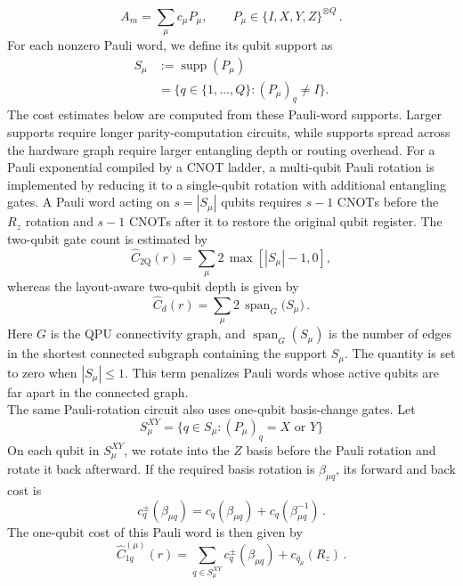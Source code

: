 \documentclass[
  reprint,
  amsmath,
  amssymb,
  aps,
  pra,
  nofootinbib,
  superscriptaddress,
  floatfix
]{revtex4-2}
\newcommand{\twq}{\mathrm{2Q}}
\begin{document}
\begin{equation}
A_m=\sum_{\mu}c_{\mu}P_{\mu}, \qquad P_{\mu}\in\{I,X,Y,Z\}^{\otimes Q}\,.
\label{eq:pauli_expansion}
\end{equation}
%
For each nonzero Pauli word, we define its qubit support as
%
\begin{equation}
\begin{aligned}
S_{\mu}
&:=\operatorname{supp}(P_{\mu}) \\
&=\{q\in\{1,\ldots,Q\}:(P_{\mu})_q\ne I\}.
\end{aligned}
\label{eq:pauli_word_support}
\end{equation}
%
The cost estimates below are computed from these Pauli-word supports. Larger supports require longer parity-computation circuits, while supports spread across the hardware graph require larger entangling depth or routing overhead. For a Pauli exponential compiled by a CNOT ladder, a multi-qubit Pauli rotation is implemented by reducing it to a single-qubit rotation with additional entangling gates. A Pauli word acting on \(s=|S_{\mu}|\) qubits requires \(s-1\) \textsc{CNOT}s before the \(R_z\) rotation and \(s-1\) \textsc{CNOT}s after it to restore the original qubit register. The two-qubit gate count is estimated by
%
\begin{equation}
\widehat C_{\twq}(r)=\sum_{\mu}2\,\max[|S_{\mu}|-1, 0],
\label{eq:pauli_2count_proxy}
\end{equation}
whereas the layout-aware two-qubit depth is given by
\begin{equation}
\widehat C_d(r)=\sum_{\mu}2\,\operatorname{span}_{G}
\bigl(S_{\mu}\bigr)\,.
\label{eq:pauli_2depth_proxy}
\end{equation}
Here \(G\) is the QPU connectivity graph, and $\operatorname{span}_{G}(S_{\mu})$ is the number of edges in the shortest connected subgraph containing the support \(S_{\mu}\). The quantity is set to zero when $|S_{\mu}|\le1$. This term penalizes Pauli words whose active qubits are far apart in the connected graph.\\
\noindent
The same Pauli-rotation circuit also uses one-qubit basis-change gates. Let
\[
S_{\mu}^{XY} = \{q\in S_{\mu}:(P_{\mu})_q = X\text{ or }Y\}
\]
On each qubit in \(S_{\mu}^{XY}\), we rotate into the \(Z\) basis before the Pauli rotation and rotate it back afterward. If the required basis rotation is $\beta_{\mu q}$, its forward and back cost is
\[
c_q^{\pm}(\beta_{\mu q})=c_q(\beta_{\mu q})+c_q(\beta^{-1}_{\mu q})\,.
\]
The one-qubit cost of this Pauli word is then given by
%
\begin{equation}
\widehat{C}_{1q}^{(\mu)}(r) = \sum_{q\in S_{\mu}^{XY}}c_q^\pm(\beta_{\mu q}) + c_{\bar{q}_{\mu}}(R_z)\,.
\end{equation}
\end{document}
